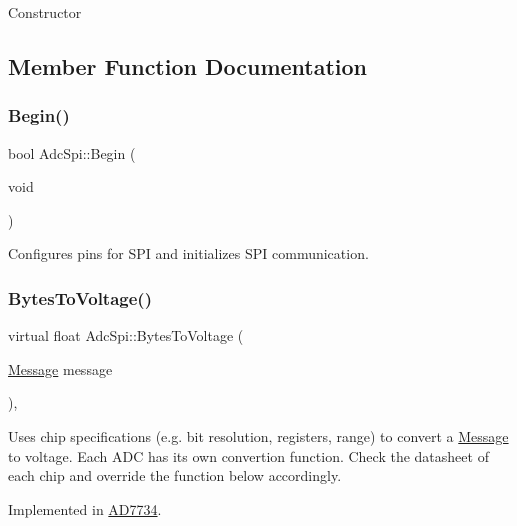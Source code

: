 Constructor 

\subsection{Member Function Documentation}
\mbox{\label{classAdcSpi_aa8f8f27578dd85cfcdbc9439bbce66cb}} 
\subsubsection{\texorpdfstring{Begin()}{Begin()}}
{\footnotesize\ttfamily bool Adc\+Spi\+::\+Begin (\begin{DoxyParamCaption}\item[{void}]{ }\end{DoxyParamCaption})}

Configures pins for S\+PI and initializes S\+PI communication. \mbox{\label{classAdcSpi_aa9970471c6fc505e4b91ac6985ac1489}} 
\subsubsection{\texorpdfstring{Bytes\+To\+Voltage()}{BytesToVoltage()}}
{\footnotesize\ttfamily virtual float Adc\+Spi\+::\+Bytes\+To\+Voltage (\begin{DoxyParamCaption}\item[{\mbox{\hyperlink{structAdcSpi_1_1Message}{Message}}}]{message }\end{DoxyParamCaption})\hspace{0.3cm}{\ttfamily [protected]}, {}}

Uses chip specifications (e.\+g. bit resolution, registers, range) to convert a \mbox{\hyperlink{structAdcSpi_1_1Message}{Message}} to voltage. Each A\+DC has its own convertion function. Check the datasheet of each chip and override the function below accordingly. 

Implemented in \mbox{\hyperlink{classAD7734_afe43654ed83d2af599bea00b93cedc28}{A\+D7734}}.

\mbox{\label{classAdcSpi_acd92eec341ed010e5b7569ffcbba811d}} 
